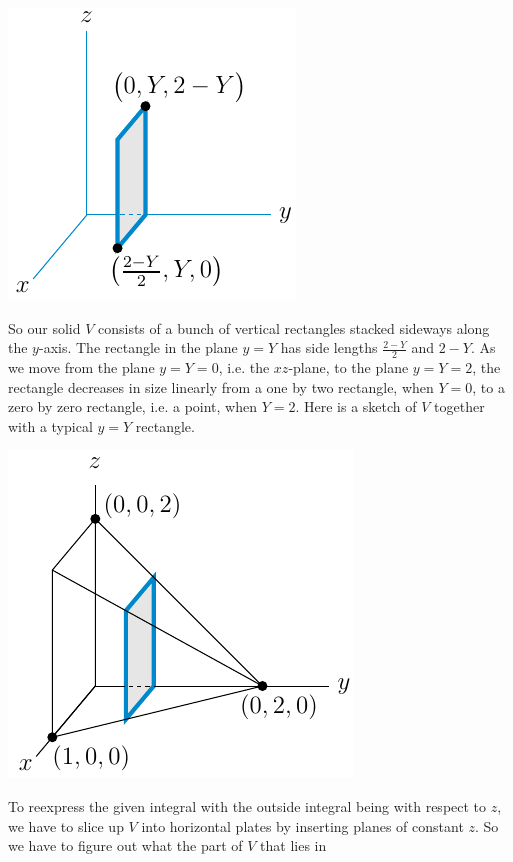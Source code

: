 \begin{eg}
\begin{efig}
\begin{center}
    \includegraphics{figures/integration/xchange5.pdf}
\end{center}
\end{efig}
So our solid $V$ consists of a bunch of vertical rectangles stacked sideways along the $y$-axis. The rectangle in the plane $y=Y$ has side lengths
$\frac{2-Y}{2}$ and $2-Y$. As we move from the plane $y=Y=0$, i.e. the $xz$-plane, to the plane $y=Y=2$, the rectangle decreases in size linearly 
from a one by two rectangle, when $Y=0$, to a zero by zero rectangle, 
i.e. a point, when $Y=2$.
Here is a sketch of $V$ together with a typical $y=Y$ rectangle.
\begin{efig}
\begin{center}
    \includegraphics{figures/integration/xchange4.pdf}
\end{center}
\end{efig}
To reexpress the given integral with the outside integral being with respect to $z$, we have to slice up $V$ into horizontal plates by inserting planes 
of constant $z$. So we have to figure out what the part of $V$ that lies in 

\end{eg}
